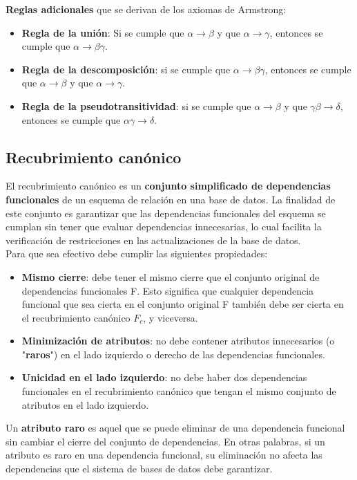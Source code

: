 \documentclass{article}
\begin{document}
\textbf{Reglas adicionales} que se derivan de los axiomas de Armstrong:
\begin{itemize}
    \item \textbf{Regla de la unión}: Si se cumple que $\alpha \xrightarrow{} \beta$ y que $\alpha \xrightarrow{} \gamma$, entonces se cumple que $\alpha \xrightarrow{} \beta\gamma$.
    \item \textbf{Regla de la descomposición}: si se cumple que $\alpha \xrightarrow{} \beta\gamma$, entonces se cumple que $\alpha \xrightarrow{} \beta$ y que $\alpha \xrightarrow{} \gamma$.
    \item \textbf{Regla de la pseudotransitividad}: si se cumple que $\alpha \xrightarrow{} \beta$ y que $\gamma\beta \xrightarrow{} \delta$, entonces se cumple que $\alpha\gamma \xrightarrow{} \delta$.
\end{itemize}

\newpage

\subsection{Recubrimiento canónico}
El recubrimiento canónico es un \textbf{conjunto simplificado de dependencias funcionales} de un esquema de relación en una base de datos. La finalidad de este conjunto es garantizar que las dependencias funcionales del esquema se cumplan sin tener que evaluar dependencias innecesarias, lo cual facilita la verificación de restricciones en las actualizaciones de la base de datos. \\
Para que sea efectivo debe cumplir las siguientes propiedades: 
\begin{itemize}
    \item \textbf{Mismo cierre}: debe tener el mismo cierre que el conjunto original de dependencias funcionales F. Esto significa que cualquier dependencia funcional que sea cierta en el conjunto original F también debe ser cierta en el recubrimiento canónico $F_c$, y viceversa.
    \item \textbf{Minimización de atributos}: no debe contener atributos innecesarios (o "\textbf{raros}") en el lado izquierdo o derecho de las dependencias funcionales.
    \item \textbf{Unicidad en el lado izquierdo}: no debe haber dos dependencias funcionales en el recubrimiento canónico que tengan el mismo conjunto de atributos en el lado izquierdo.
\end{itemize}

Un \textbf{atributo raro} es aquel que se puede eliminar de una dependencia funcional sin cambiar el cierre del conjunto de dependencias. En otras palabras, si un atributo es raro en una dependencia funcional, su eliminación no afecta las dependencias que el sistema de bases de datos debe garantizar. 
\end{document}
